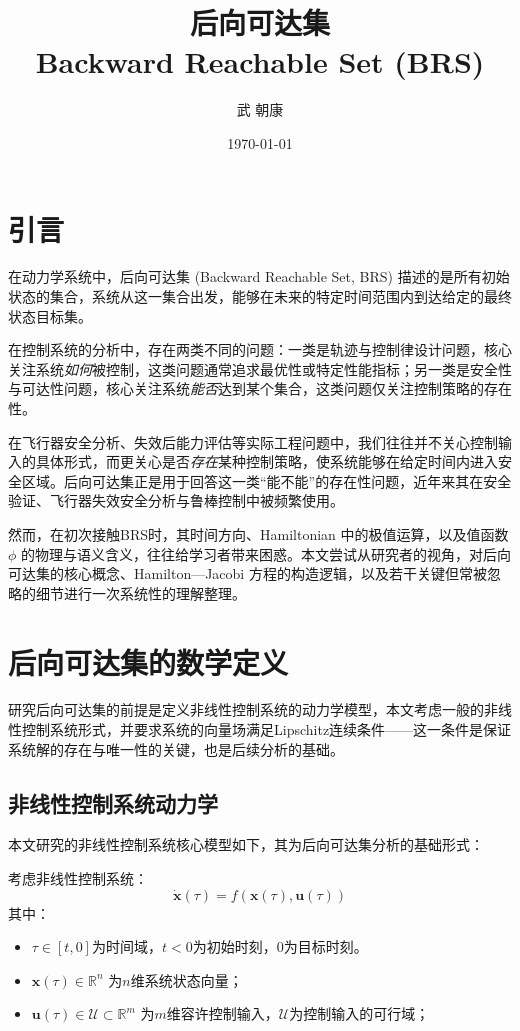 \documentclass[11pt]{ctexrep}
\title{后向可达集\\Backward Reachable Set (BRS)}
\author{武 朝康}
\date{\today}
\begin{document}
\maketitle

\section{引言}
在动力学系统中，后向可达集 (Backward Reachable Set, BRS) 描述的是所有初始状态的集合，系统从这一集合出发，能够在未来的特定时间范围内到达给定的最终状态目标集。

在控制系统的分析中，存在两类不同的问题：一类是轨迹与控制律设计问题，核心关注系统\emph{如何}被控制，这类问题通常追求最优性或特定性能指标；另一类是安全性与可达性问题，核心关注系统\emph{能否}达到某个集合，这类问题仅关注控制策略的存在性。

在飞行器安全分析、失效后能力评估等实际工程问题中，我们往往并不关心控制输入的具体形式，而更关心是否\emph{存在}某种控制策略，使系统能够在给定时间内进入安全区域。后向可达集正是用于回答这一类“能不能”的存在性问题，近年来其在安全验证、飞行器失效安全分析与鲁棒控制中被频繁使用。

然而，在初次接触BRS时，其时间方向、Hamiltonian 中的极值运算，以及值函数 $\phi$ 的物理与语义含义，往往给学习者带来困惑。本文尝试从研究者的视角，对后向可达集的核心概念、Hamilton---Jacobi 方程的构造逻辑，以及若干关键但常被忽略的细节进行一次系统性的理解整理。

\section{后向可达集的数学定义}
研究后向可达集的前提是定义非线性控制系统的动力学模型，本文考虑一般的非线性控制系统形式，并要求系统的向量场满足Lipschitz连续条件——这一条件是保证系统解的存在与唯一性的关键，也是后续分析的基础。

\subsection{非线性控制系统动力学}
本文研究的非线性控制系统核心模型如下，其为后向可达集分析的基础形式：
\begin{tcolorbox}[mystyle,title={模型定义}]
考虑非线性控制系统：
\begin{equation}\label{eq:dyn}
\dot{\mathbf{x}}(\tau) = f(\mathbf{x}(\tau), \mathbf{u}(\tau))
\end{equation}
其中：
	\begin{itemize}
		\item $\tau \in [t,0]$为时间域，$t<0$为初始时刻，$0$为目标时刻。
		\item  $\mathbf{x}(\tau) \in \mathbb{R}^n$ 为$n$维系统状态向量；
		\item $\mathbf{u}(\tau) \in \mathcal{U} \subset \mathbb{R}^m$ 为$m$维容许控制输入，$\mathcal{U}$为控制输入的可行域；
	\end{itemize}
\end{tcolorbox}
\end{document}
